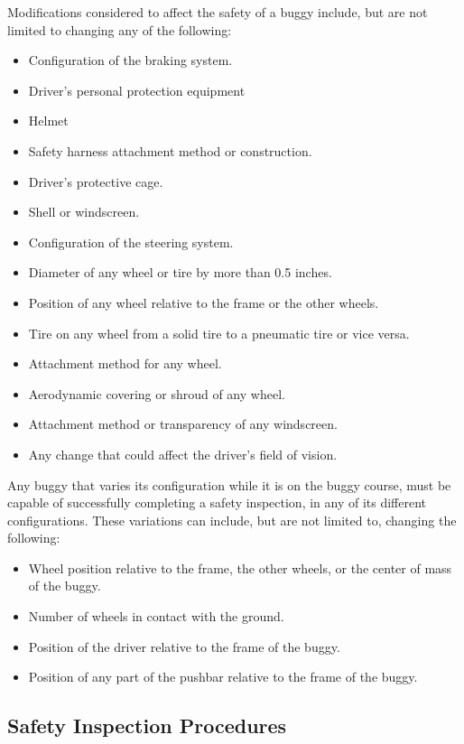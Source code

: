 	\noindent Modifications considered to affect the safety of a buggy include, but are
	not limited to changing any of the following:
	
	\begin{itemize}
		\item Configuration of the braking system.
		\item Driver's personal protection equipment
		\item Helmet
		\item Safety harness attachment method or construction.
		\item Driver's protective cage.
		\item Shell or windscreen.
		\item Configuration of the steering system.
		\item Diameter of any wheel or tire by more than 0.5 inches.
		\item Position of any wheel relative to the frame or the other wheels.
		\item Tire on any wheel from a solid tire to a pneumatic tire or vice versa.
		\item Attachment method for any wheel.
		\item Aerodynamic covering or shroud of any wheel.
		\item Attachment method or transparency of any windscreen.
		\item Any change that could affect the driver's field of vision.
	\end{itemize}

	\noindent Any buggy that varies its configuration while it is on the buggy course, must
	be capable of successfully completing a safety inspection, in any of its
	different configurations. These variations can include, but are not limited to,
	changing the following:

	\begin{itemize}
		\item Wheel position relative to the frame, the other wheels, or the center of mass of the buggy.
		\item Number of wheels in contact with the ground.
		\item Position of the driver relative to the frame of the buggy.
		\item Position of any part of the pushbar relative to the frame of the buggy.
	\end{itemize}

\subsection{Safety Inspection Procedures}

